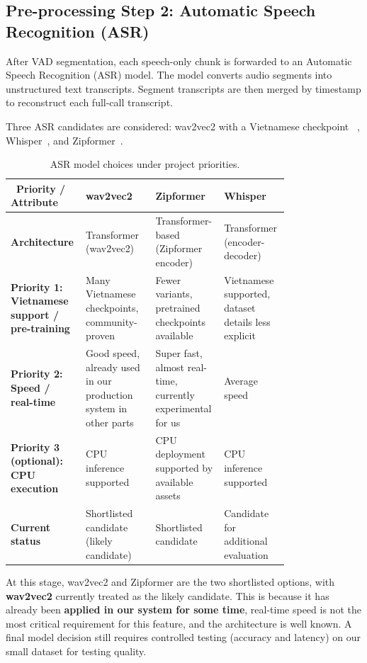 \documentclass[ 
  journal=medium,
  manuscript={Contextual Information Extraction of Customer Data from Sales audio calls},
  year=2026,
  volume=0,
]{cup-journal}
\begin{document}
\subsection{Pre-processing Step 2: Automatic Speech Recognition (ASR)}
After VAD segmentation, each speech-only chunk is forwarded to an Automatic Speech Recognition (ASR) model. The model converts audio segments into unstructured text transcripts. Segment transcripts are then merged by timestamp to reconstruct each full-call transcript.

Three ASR candidates are considered: wav2vec2 with a Vietnamese checkpoint ~\cite{nguyenvulebinh_wav2vec2_base_vi}, Whisper~\cite{whisper_repo}, and Zipformer~\cite{zipformer_hf,zipformer_paper}.

\begin{table}[hbt!]
  \centering
  \caption{ASR model choices under project priorities.}
  \label{tab:asr_model_choices}
  \begin{tabular}{p{0.18\linewidth}p{0.24\linewidth}p{0.18\linewidth}p{0.18\linewidth}}
    \
    \textbf{Priority / Attribute} & \textbf{wav2vec2}~\cite{nguyenvulebinh_wav2vec2_base_vi} & \textbf{Zipformer}~\cite{zipformer_hf,zipformer_paper} & \textbf{Whisper}~\cite{whisper_repo} \\
    \midrule
    \textbf{Architecture} & Transformer (wav2vec2) & Transformer-based (Zipformer encoder) & Transformer (encoder-decoder) \\
    \textbf{Priority 1: Vietnamese support / pre-training} & Many Vietnamese checkpoints, community-proven & Fewer variants, pretrained checkpoints available & Vietnamese supported, dataset details less explicit \\
    \textbf{Priority 2: Speed / real-time} & Good speed, already used in our production system in other parts & Super fast, almost real-time, currently experimental for us & Average speed \\
    \textbf{Priority 3 (optional): CPU execution} & CPU inference supported & CPU deployment supported by available assets & CPU inference supported \\
    \textbf{Current status} & Shortlisted candidate (likely candidate) & Shortlisted candidate & Candidate for additional evaluation \\
    \bottomrule
  \end{tabular}
\end{table}

At this stage, wav2vec2 and Zipformer are the two shortlisted options, with \textbf{wav2vec2} currently treated as the likely candidate. This is because it has already been \textbf{applied in our system for some time}, real-time speed is not the most critical requirement for this feature, and the architecture is well known. A final model decision still requires controlled testing (accuracy and latency) on our small dataset for testing quality.
\end{document}
